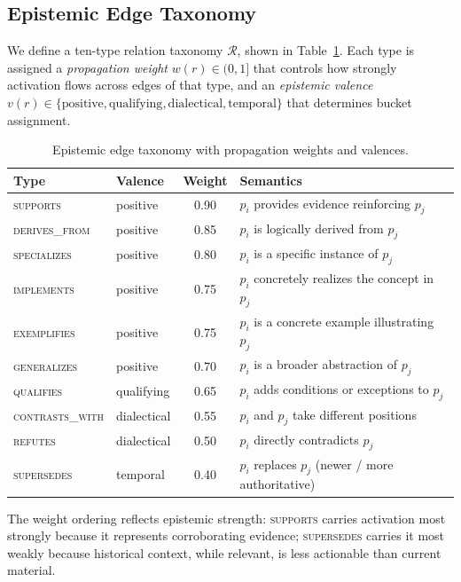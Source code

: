 \documentclass[11pt,a4paper]{article}
\begin{document}
\subsection{Epistemic Edge Taxonomy}
\label{sec:taxonomy}

We define a ten-type relation taxonomy $\mathcal{R}$, shown in
Table~\ref{tab:taxonomy}. Each type is assigned a
\emph{propagation weight} $w(r) \in (0, 1]$ that controls how strongly
activation flows across edges of that type, and an
\emph{epistemic valence} $v(r) \in \{\text{positive}, \text{qualifying},
\text{dialectical}, \text{temporal}\}$ that determines bucket assignment.

\begin{table}[ht]
\centering
\caption{Epistemic edge taxonomy with propagation weights and valences.}
\label{tab:taxonomy}
\small
\begin{tabular}{llcp{4.0cm}}
\toprule
\textbf{Type} & \textbf{Valence} & \textbf{Weight} & \textbf{Semantics} \\
\midrule
\textsc{supports}       & positive    & 0.90 & $p_i$ provides evidence reinforcing $p_j$ \\
\textsc{derives\_from}  & positive    & 0.85 & $p_i$ is logically derived from $p_j$ \\
\textsc{specializes}    & positive    & 0.80 & $p_i$ is a specific instance of $p_j$ \\
\textsc{implements}     & positive    & 0.75 & $p_i$ concretely realizes the concept in $p_j$ \\
\textsc{exemplifies}    & positive    & 0.75 & $p_i$ is a concrete example illustrating $p_j$ \\
\textsc{generalizes}    & positive    & 0.70 & $p_i$ is a broader abstraction of $p_j$ \\
\textsc{qualifies}      & qualifying  & 0.65 & $p_i$ adds conditions or exceptions to $p_j$ \\
\textsc{contrasts\_with}& dialectical & 0.55 & $p_i$ and $p_j$ take different positions \\
\textsc{refutes}        & dialectical & 0.50 & $p_i$ directly contradicts $p_j$ \\
\textsc{supersedes}     & temporal    & 0.40 & $p_i$ replaces $p_j$ (newer / more authoritative) \\
\bottomrule
\end{tabular}
\end{table}

The weight ordering reflects epistemic strength: \textsc{supports}
carries activation most strongly because it represents corroborating evidence;
\textsc{supersedes} carries it most weakly because historical context,
while relevant, is less actionable than current material.
\end{document}
